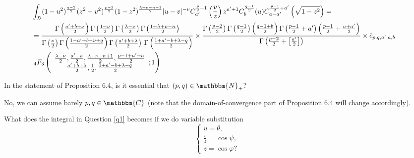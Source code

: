 \documentclass{article}
\begin{document}
\begin{eqnarray}
  & \int_D (1 - u^2)^{\frac{q - 2}{2}} (z^2 - v^2)^{\frac{p - 3}{2}} (1 -
  z^2)^{\frac{\lambda + \nu - n - 1}{2}} | u - v |^{- \nu} C^{\frac{p}{2} -
  1}_{a'} \left( \frac{v}{z} \right) z^{a' + 1} C^{\frac{q - 1}{2}}_b (u)
  C^{\frac{p - 1}{2} + a'}_{a - a'} \left( \sqrt{1 - z^2} \right) = & 
  \nonumber\\
  & = \frac{\Gamma \left( \frac{a' + b + \nu}{2} \right) \Gamma \left(
  \frac{1 - \nu}{2} \right) \Gamma \left( \frac{\lambda - \nu}{2} \right)
  \Gamma \left( \frac{1 + \lambda + \nu - n}{2} \right)}{\Gamma \left(
  \frac{\nu}{2} \right) \Gamma \left( \frac{1 - a' + b - \nu + q}{2} \right)
  \Gamma \left( \frac{a' + b + \lambda}{2} \right)  \hspace{0.17em} \Gamma
  \left( \frac{1 + a' - b + \lambda - q}{2} \right)} \times \frac{\Gamma
  \left( \frac{p - 2}{2} \right) \Gamma \left( \frac{q - 1}{2} \right) \left(
  \frac{q - 1 + b}{2} \right) \Gamma \left( \frac{p - 1}{2} + a' \right)
  \left( \frac{p - 1}{2} + \frac{a + a'}{2} \right)}{\Gamma \left( \frac{p -
  2}{2} + \left[ \frac{a'}{2} \right] \right)} \times \tilde{c}_{p, q, a', a,
  b} &  \nonumber\\
  & \;_4 F_3 \left( \begin{array}{c}
    \frac{\lambda - \nu}{2}, \frac{a' - a}{2}, \frac{\lambda + \nu - n +
    1}{2}, \frac{p - 1 + a' + a}{2}\\
    \frac{a' + b + \lambda}{2}, \frac{1}{2}, \frac{1 + a' - b + \lambda -
    q}{2}
  \end{array} ; 1 \right) &  \nonumber
\end{eqnarray}
\begin{question}
  In the statement of Proposition 6.4, is it essential that $(p, q) \in
  \mathbbm{N}_+$?
\end{question}

\begin{answer}
  No, we can assume barely $p, q \in \mathbbm{C}$ (note that the
  domain-of-convergence part of Proposition 6.4 will change accordingly).
\end{answer}

\begin{question}
  What does the integral in Question \ref{q1} becomes if we do variable
  substitution
  \[ \left\{ \begin{array}{l}
       u = \theta,\\
       \frac{v}{z} = \cos \psi,\\
       z = \cos \varphi ?
     \end{array} \right. \]
\end{question}
\end{document}
